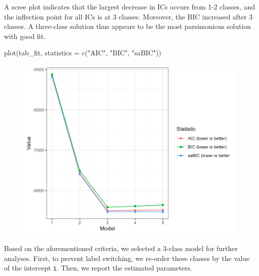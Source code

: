 \documentclass[
  man,floatsintext]{apa6}
\newenvironment{Shaded}{\begin{snugshade}}{\end{snugshade}}
\newcommand{\AttributeTok}[1]{\textcolor[rgb]{0.77,0.63,0.00}{#1}}
\newcommand{\CommentTok}[1]{\textcolor[rgb]{0.56,0.35,0.01}{\textit{#1}}}
\newcommand{\ConstantTok}[1]{\textcolor[rgb]{0.00,0.00,0.00}{#1}}
\newcommand{\DecValTok}[1]{\textcolor[rgb]{0.00,0.00,0.81}{#1}}
\newcommand{\FunctionTok}[1]{\textcolor[rgb]{0.00,0.00,0.00}{#1}}
\newcommand{\NormalTok}[1]{#1}
\newcommand{\OtherTok}[1]{\textcolor[rgb]{0.56,0.35,0.01}{#1}}
\newcommand{\SpecialCharTok}[1]{\textcolor[rgb]{0.00,0.00,0.00}{#1}}
\newcommand{\StringTok}[1]{\textcolor[rgb]{0.31,0.60,0.02}{#1}}
\begin{document}
A scree plot indicates that the largest decrease in ICs occurs from 1-2
classes, and the inflection point for all ICs is at 3 classes. Moreover,
the BIC increased after 3 classes. A three-class solution thus appears
to be the most parsimonious solution with good fit.

\begin{Shaded}
\begin{Highlighting}[]
\FunctionTok{plot}\NormalTok{(tab\_fit, }\AttributeTok{statistics =} \FunctionTok{c}\NormalTok{(}\StringTok{"AIC"}\NormalTok{, }\StringTok{"BIC"}\NormalTok{, }\StringTok{"saBIC"}\NormalTok{))}
\end{Highlighting}
\end{Shaded}

\begin{figure}
\includegraphics[width=0.5\linewidth]{appendices/lcga_plot_fit} \caption{ }\label{fig:unnamed-chunk-15}
\end{figure}

Based on the aforementioned criteria, we selected a 3-class model for
further analyses. First, to prevent label switching, we re-order these
classes by the value of the intercept \texttt{i}. Then, we report the estimated
parameters.

\begin{Shaded}
\end{Shaded}
\end{document}

